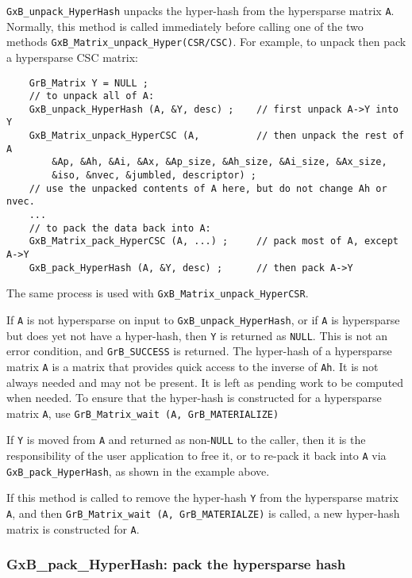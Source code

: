 \documentclass[12pt]{article}
\begin{document}
\verb'GxB_unpack_HyperHash' unpacks the hyper-hash from the hypersparse matrix
\verb'A'.  Normally, this method is called immediately before calling one of
the two methods \verb'GxB_Matrix_unpack_Hyper(CSR/CSC)'.  For example, to
unpack then pack a hypersparse CSC matrix:

    {\footnotesize
    \begin{verbatim}
    GrB_Matrix Y = NULL ;
    // to unpack all of A:
    GxB_unpack_HyperHash (A, &Y, desc) ;    // first unpack A->Y into Y
    GxB_Matrix_unpack_HyperCSC (A,          // then unpack the rest of A
        &Ap, &Ah, &Ai, &Ax, &Ap_size, &Ah_size, &Ai_size, &Ax_size,
        &iso, &nvec, &jumbled, descriptor) ;
    // use the unpacked contents of A here, but do not change Ah or nvec.
    ...
    // to pack the data back into A:
    GxB_Matrix_pack_HyperCSC (A, ...) ;     // pack most of A, except A->Y
    GxB_pack_HyperHash (A, &Y, desc) ;      // then pack A->Y \end{verbatim}}

The same process is used with \verb'GxB_Matrix_unpack_HyperCSR'.

If \verb'A' is not hypersparse on input to \verb'GxB_unpack_HyperHash', or if
\verb'A' is hypersparse but does yet not have a hyper-hash, then \verb'Y' is
returned as \verb'NULL'.  This is not an error condition, and
\verb'GrB_SUCCESS' is returned.  The hyper-hash of a hypersparse matrix
\verb'A' is a matrix that provides quick access to the inverse of \verb'Ah'.
It is not always needed and may not be present.  It is left as pending work to
be computed when needed.  To ensure that the hyper-hash is constructed for a
hypersparse matrix \verb'A', use \verb'GrB_Matrix_wait (A, GrB_MATERIALIZE)'

If \verb'Y' is moved from \verb'A' and returned as non-\verb'NULL' to the
caller, then it is the responsibility of the user application to free it, or to
re-pack it back into \verb'A' via \verb'GxB_pack_HyperHash', as shown in the
example above.

If this method is called to remove the hyper-hash \verb'Y' from the hypersparse
matrix \verb'A', and then \verb'GrB_Matrix_wait (A, GrB_MATERIALZE)' is called,
a new hyper-hash matrix is constructed for \verb'A'.

\newpage
\subsubsection{{\sf GxB\_pack\_HyperHash:} pack the hypersparse hash}
\label{pack_hyperhash}
\end{document}
